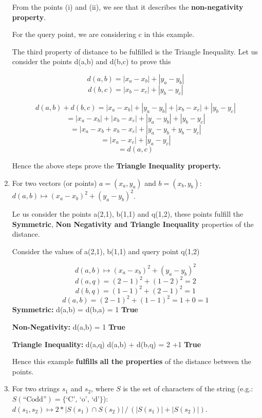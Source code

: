 \documentclass{article}
\begin{document}
\begin{enumerate}
    From the points (i) and (ii), we see that it describes the \textbf{non-negativity property}.

    For the query point, we are considering c in this example.
    
    The third property of distance to be fulfilled is the Triangle Inequality. Let us consider the points d(a,b) and d(b,c) to prove this

    \[d(a, b) = | x_a - x_b | + | y_a - y_b |\]
    \[d(b, c) = | x_b - x_c | + | y_b - y_c | \]
    
    \[d(a,b) + d(b,c) = | x_a - x_b | + | y_a - y_b | + | x_b - x_c | + | y_b - y_c | \]
    \quad  \[ = | x_a - x_b | + | x_b - x_c | + | y_a - y_b | + | y_b - y_c | \]
    \quad \[= |x_a - x_b + x_b - x_c| + | y_a - y_b + y_b - y_c | \]
    \quad \[=|x_a - x_c| + |y_a - y_c |\]
    \quad \[=d(a,c)\]

    Hence the above steps prove the \textbf{Triangle Inequality property.}
    
    
    
    \item\label{l2} 
    For two vectors (or points) $a=(x_a, y_a)$ and $b=(x_b, y_b)$:
    $d(a, b) \mapsto ( x_a - x_b )^2 + ( y_a - y_b )^2$.

    Le us consider the points a(2,1), b(1,1) and q(1,2), these points fulfill the \textbf{Symmetric}, \textbf{Non Negativity and Triangle Inequality} properties of the distance.

    Consider the values of a(2,1), b(1,1) and query point q(1,2)

    \[d(a, b) \mapsto ( x_a - x_b )^2 + ( y_a - y_b )^2\]
    \quad \[d(a,q) = (2-1)^2 + (1-2)^2 = 2\]
    \quad \[d(b,q) = (1-1)^2 + (2-1)^2 = 1\]
    \quad \[d(a,b) = (2-1)^2 + (1-1)^2 = 1+0 = 1\]
    \textbf{Symmetric:} d(a,b) = d(b,a) = 1 \textbf{True}
    
    \textbf{Non-Negativity:} d(a,b)  =  1  \textbf{ True}

   \textbf{ Triangle Inequality:} d(a,q) \leq d(a,b) + d(b,q) = 2 +1 \textbf{True}

   Hence this example \textbf{fulfills} \textbf{all the properties} of the distance between the points.

 
      \item\label{l3} 
      For two strings $s_1$ and $s_2$, where $S$ is the set of characters of the string (e.g.: $S(\text{``Codd''}) = \{\text{`C', `o', `d'}\}$):
      $d(s_1, s_2) \mapsto 2* |S(s_1) \cap S(s_2)| \, / \, (|S(s_1)| + |S(s_2)|)$.\\


\end{enumerate}
\end{document}
